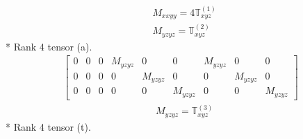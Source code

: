 \documentclass[fleqn,8pt,landscape]{jsarticle}
\begin{document}
\begin{align*}
& M_{xxyy} = 4 \mathbb{T}_{xyz}^{(1)} \\
& M_{yzyz} = \mathbb{T}_{xyz}^{(2)}
\end{align*}
* Rank 4 tensor (a).
\begin{align*}
\begin{bmatrix} 0 & 0 & 0 & M_{yzyz} & 0 & 0 & M_{yzyz} & 0 & 0 \\ 0 & 0 & 0 & 0 & M_{yzyz} & 0 & 0 & M_{yzyz} & 0 \\ 0 & 0 & 0 & 0 & 0 & M_{yzyz} & 0 & 0 & M_{yzyz} \end{bmatrix}
\end{align*}
\begin{align*}
& M_{yzyz} = \mathbb{T}_{xyz}^{(3)}
\end{align*}
* Rank 4 tensor (t).
\end{document}
